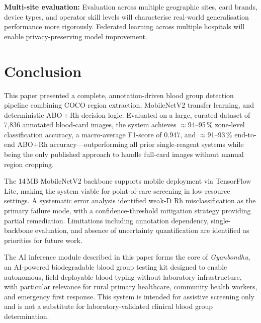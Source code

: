 \documentclass[journal]{IEEEtran}
\begin{document}
\textbf{Multi-site evaluation:}
Evaluation across multiple geographic sites, card brands, device
types, and operator skill levels will characterise real-world
generalisation performance more rigorously.
Federated learning across multiple hospitals will enable
privacy-preserving model improvement.

\section{Conclusion}
\label{sec:conclusion}

This paper presented a complete, annotation-driven blood group
detection pipeline combining COCO region extraction, MobileNetV2
transfer learning, and deterministic ABO\,+\,Rh decision logic.
Evaluated on a large, curated dataset of 7,836 annotated blood-card
images, the system achieves $\approx$94--95\,\% zone-level
classification accuracy, a macro-average F1-score of 0.947, and
$\approx$91--93\,\% end-to-end ABO+Rh accuracy---outperforming all
prior single-reagent systems while being the only published approach
to handle full-card images without manual region cropping.

The 14\,MB MobileNetV2 backbone supports mobile deployment via
TensorFlow Lite, making the system viable for point-of-care
screening in low-resource settings.
A systematic error analysis identified weak-D Rh misclassification
as the primary failure mode, with a confidence-threshold mitigation
strategy providing partial remediation.
Limitations including annotation dependency, single-backbone
evaluation, and absence of uncertainty quantification are identified
as priorities for future work.

The AI inference module described in this paper forms the core of
\emph{Gyanbondhu}, an AI-powered biodegradable blood group testing
kit designed to enable autonomous, field-deployable blood typing
without laboratory infrastructure, with particular relevance for
rural primary healthcare, community health workers, and
emergency first response.
This system is intended for assistive screening only and is not
a substitute for laboratory-validated clinical blood group
determination.
\end{document}
